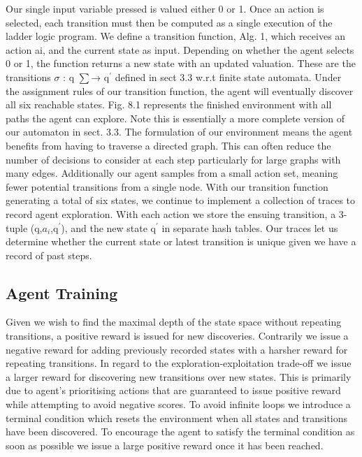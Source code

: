 \documentclass[runningheads]{llncs}
\begin{document}
Our single input variable pressed is valued either 0 or 1. Once an action is selected, each transition must then be computed as a single execution of the ladder logic program. We define a transition function, Alg. 1, which receives an action ai, and the current state as input. Depending on whether the agent selects 0 or 1, the function returns a new state with an updated valuation. These are the transitions $\sigma$ : q $\sum$→ q$^{\prime}$ defined in sect 3.3 w.r.t finite state automata. Under the assignment rules of our transition function, the agent will eventually discover all six reachable states. Fig. 8.1 represents the finished environment with all paths the agent can explore. Note this is essentially a more complete version of our automaton in sect. 3.3. The formulation of our environment means the agent benefits from having to traverse a directed graph. This can often reduce the number of decisions to consider at each step particularly for large graphs with many edges. Additionally our agent
samples from a small action set, meaning fewer potential transitions from a single node. With our transition function generating a total of six states, we continue to implement a collection of traces to record agent exploration. With each action we store the ensuing transition, a 3-tuple (q,$a_{i}$,q$^{\prime}$), and the new state q$^{\prime}$ in separate hash tables. Our traces let us determine whether the current state or latest transition is unique given we have a record of past steps. 

\subsection{Agent Training}
Given we wish to find the maximal depth of the state space without repeating transitions, a positive reward is issued for new discoveries. Contrarily we issue a negative reward for adding previously recorded states with a harsher reward for repeating transitions. In regard to the exploration-exploitation trade-off we issue a larger reward for discovering new transitions over new states. This is primarily due to agent’s prioritising actions that
are guaranteed to issue positive reward while attempting to avoid negative scores. To avoid infinite loops we introduce a terminal condition which resets the environment when all states and transitions have been discovered. To encourage the agent to satisfy the terminal condition as soon as possible we issue a large positive reward once it has been reached.
\end{document}
